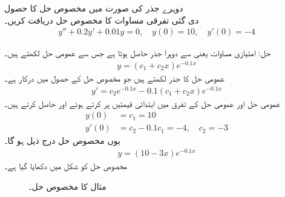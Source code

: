 \quad دوہرے جذر کی صورت میں مخصوص حل کا حصول\\
دی گئی تفرقی مساوات کا مخصوص حل دریافت کریں۔
\begin{align*}
y''+0.2y'+0.01y=0, \quad y(0)=10, \quad y'(0)=-4
\end{align*}

حل: امتیازی مساوات  یعنی  سے   دوہرا جذر حاصل ہوتا ہے جس سے عمومی حل لکھتے ہیں۔
\begin{align*}
y=(c_1+c_2 x)e^{-0.1x}
\end{align*}
عمومی حل کا جذر لکھتے ہیں جو مخصوص حل کے حصول میں درکار ہے۔
\begin{align*}
y'=c_2 e^{-0.1x}-0.1(c_1+c_2 x)e^{-0.1x}
\end{align*}
عمومی حل اور عمومی حل کے تفرق  میں ابتدائی قیمتیں پر کرتے ہوئے  اور  حاصل کرتے ہیں۔
\begin{align*}
y(0)&=c_1=10\\
y'(0)&=c_2-0.1 c_1=-4, \quad c_2=-3
\end{align*}
یوں مخصوص حل درج ذیل ہو گا۔
\begin{align*}
y=(10-3x)e^{-0.1x}
\end{align*}
مخصوص حل کو شکل  میں دکھایا گیا ہے۔
\begin{figure}
\centering
{}
\caption{مثال  کا مخصوص حل۔}
\label{شکل_مثال_سادہ_دو_درجی_حقیقی_دوہرا_جذر}
\end{figure}

